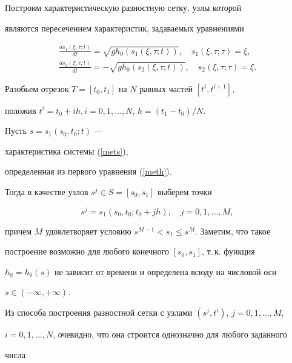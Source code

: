 Построим характеристическую разностную сетку, узлы которой


являются пересечением характеристик, задаваемых уравнениями


\begin{equation}


\begin{split}


\frac{ds_1(\xi,\tau;t)}{dt}=\sqrt{gh_0(s_1(\xi,\tau;t))},


\quad s_1(\xi,\tau;\tau)=\xi,\\


\frac{ds_2(\xi,\tau;t)}{dt}=-\sqrt{gh_0(s_2(\xi,\tau;t))},


\quad s_2(\xi,\tau;\tau)=\xi.


\end{split}


\label{meth}


\end{equation}





Разобьем отрезок $T=[t_0,t_1]$ на $N$ равных частей $[t^i,t^{i+1}]$,


положив $t^i=t_0+ih,i=0,1,\dotsc,N$, $h=(t_1-t_0)/N$.


Пусть $s=s_1(s_0,t_0;t)$ ---


характеристика системы (\ref{mets}),


определенная из первого уравнения  (\ref{meth}).


Тогда в качестве узлов $s^j\in S=[s_0,s_1]$ выберем точки 


$$


s^j=s_1(s_0,t_0;t_0+jh),\quad j=0,1,\dotsc,M,


$$


причем $M$ удовлетворяет условию $s^{M-1}<s_1\leq s^M$. Заметим, что такое 


построение возможно для любого конечного $[s_0,s_1]$, т.\,к. функция 


$h_0=h_0(s)$ не зависит от времени и определена всюду на числовой оси 


$s\in(-\infty,+\infty)$.





Из способа построения разностной сетки с узлами $(s^j,t^i)$, $j=0,1,\dotsc,M$, 


$i=0,1,\dotsc,N$, очевидно, что она строится однозначно для любого заданного


числа 


